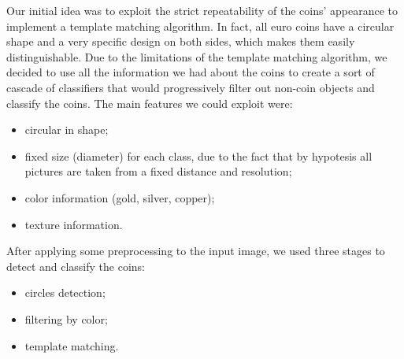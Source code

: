 
Our initial idea was to exploit the strict repeatability of the coins' appearance to implement a template matching algorithm.
In fact, all euro coins have a circular shape and a very specific design on both sides, which makes them easily distinguishable. 
Due to the limitations of the template matching algorithm, we decided to use all the information we had about the coins to create a sort of cascade of classifiers that would progressively filter out non-coin objects and classify the coins.
The main features we could exploit were:
\begin{itemize}
    \item circular in shape;
    \item fixed size (diameter) for each class, due to the fact that by hypotesis all pictures are taken from a fixed distance and resolution;
    \item color information (gold, silver, copper);
    \item texture information.
\end{itemize}
After applying some preprocessing to the input image, we used three stages to detect and classify the coins:
\begin{itemize}
    \item circles detection;
    \item filtering by color;
    \item template matching.
\end{itemize}